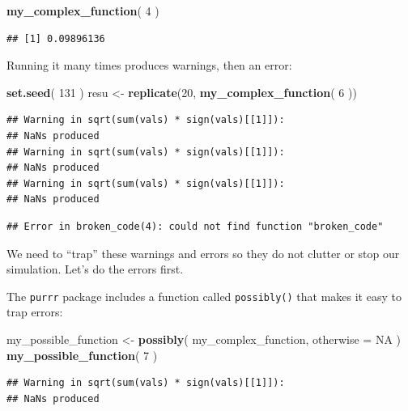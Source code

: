 \documentclass[
]{book}
\newenvironment{Shaded}{\begin{snugshade}}{\end{snugshade}}
\newcommand{\AttributeTok}[1]{\textcolor[rgb]{0.13,0.29,0.53}{#1}}
\newcommand{\ConstantTok}[1]{\textcolor[rgb]{0.56,0.35,0.01}{#1}}
\newcommand{\DecValTok}[1]{\textcolor[rgb]{0.00,0.00,0.81}{#1}}
\newcommand{\FunctionTok}[1]{\textcolor[rgb]{0.13,0.29,0.53}{\textbf{#1}}}
\newcommand{\NormalTok}[1]{#1}
\newcommand{\OtherTok}[1]{\textcolor[rgb]{0.56,0.35,0.01}{#1}}
\begin{document}
\begin{Shaded}
\begin{Highlighting}[]
\FunctionTok{my\_complex\_function}\NormalTok{( }\DecValTok{4}\NormalTok{ )}
\end{Highlighting}
\end{Shaded}

\begin{verbatim}
## [1] 0.09896136
\end{verbatim}

Running it many times produces warnings, then an error:

\begin{Shaded}
\begin{Highlighting}[]
\FunctionTok{set.seed}\NormalTok{( }\DecValTok{131}\NormalTok{ )}
\NormalTok{resu }\OtherTok{\textless{}{-}} \FunctionTok{replicate}\NormalTok{(}\DecValTok{20}\NormalTok{, }\FunctionTok{my\_complex\_function}\NormalTok{( }\DecValTok{6}\NormalTok{ ))}
\end{Highlighting}
\end{Shaded}

\begin{verbatim}
## Warning in sqrt(sum(vals) * sign(vals)[[1]]):
## NaNs produced
## Warning in sqrt(sum(vals) * sign(vals)[[1]]):
## NaNs produced
## Warning in sqrt(sum(vals) * sign(vals)[[1]]):
## NaNs produced
\end{verbatim}

\begin{verbatim}
## Error in broken_code(4): could not find function "broken_code"
\end{verbatim}

We need to ``trap'' these warnings and errors so they do not clutter or stop our simulation.
Let's do the errors first.

The \texttt{purrr} package includes a function called \texttt{possibly()} that makes it easy to trap errors:

\begin{Shaded}
\begin{Highlighting}[]
\NormalTok{my\_possible\_function }\OtherTok{\textless{}{-}} \FunctionTok{possibly}\NormalTok{( my\_complex\_function, }\AttributeTok{otherwise =} \ConstantTok{NA}\NormalTok{ )}
\FunctionTok{my\_possible\_function}\NormalTok{( }\DecValTok{7}\NormalTok{ )}
\end{Highlighting}
\end{Shaded}

\begin{verbatim}
## Warning in sqrt(sum(vals) * sign(vals)[[1]]):
## NaNs produced
\end{verbatim}
\end{document}
